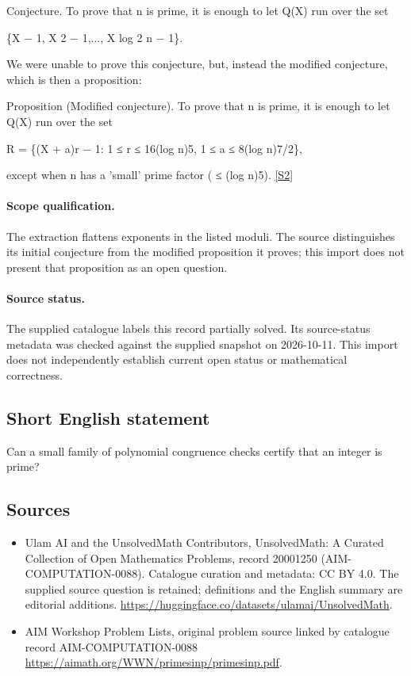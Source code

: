\documentclass[11pt]{article}
\newcommand{\sref}[2]{\hyperlink{source:#1:#2}{[S#2]}}
\begin{document}
Conjecture. To prove that n is prime, it is enough to let Q(X) run over the set

\{X − 1, X 2 − 1,..., X log 2 n − 1\}.

We were unable to prove this conjecture, but, instead the modified conjecture, which is then a proposition:

Proposition (Modified conjecture). To prove that n is prime, it is enough to let Q(X) run over the set

R = \{(X + a)r − 1: 1 ≤ r ≤ 16(log n)5, 1 ≤ a ≤ 8(log n)7/2\},

except when n has a 'small' prime factor ( ≤ (log n)5). \sref{20001250}{2}
\paragraph{Scope qualification.}
The extraction flattens exponents in the listed moduli. The source distinguishes its initial conjecture from the modified proposition it proves; this import does not present that proposition as an open question.
\paragraph{Source status.}
The supplied catalogue labels this record partially solved. Its source-status metadata was checked against the supplied snapshot on 2026-10-11. This import does not independently establish current open status or mathematical correctness.
\subsection{Short English statement}
Can a small family of polynomial congruence checks certify that an integer is prime?
\subsection{Sources}
\begin{itemize}
\item[\hypertarget{source:20001250:1}{S1}] Ulam AI and the UnsolvedMath Contributors, UnsolvedMath: A Curated Collection of Open Mathematics Problems, record 20001250 (AIM-COMPUTATION-0088). Catalogue curation and metadata: CC BY 4.0. The supplied source question is retained; definitions and the English summary are editorial additions.
\url{https://huggingface.co/datasets/ulamai/UnsolvedMath}.
\item[\hypertarget{source:20001250:2}{S2}] AIM Workshop Problem Lists, original problem source linked by catalogue record AIM-COMPUTATION-0088
\url{https://aimath.org/WWN/primesinp/primesinp.pdf}.
\end{itemize}
\end{document}
